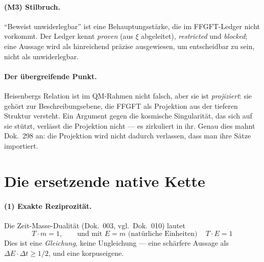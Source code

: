 \paragraph{(M3) Stilbruch.} \enquote{Beweist unwiderlegbar} ist eine Behauptungsstärke, die im
FFGFT-Ledger nicht vorkommt. Der Ledger kennt \emph{proven} (aus $\xi$ abgeleitet),
\emph{restricted} und \emph{blocked}; eine Aussage wird als hinreichend präzise ausgewiesen, um
entscheidbar zu sein, nicht als unwiderlegbar.

\paragraph{Der übergreifende Punkt.} Heisenbergs Relation ist im QM-Rahmen nicht falsch, aber sie
ist \emph{projiziert}: sie gehört zur Beschreibungsebene, die FFGFT als Projektion aus der
tieferen Struktur versteht. Ein Argument gegen die kosmische Singularität, das sich auf sie
stützt, verlässt die Projektion nicht --- es zirkuliert in ihr. Genau dies mahnt Dok.~298 an: die
Projektion wird nicht dadurch verlassen, dass man ihre Sätze importiert.

\section{Die ersetzende native Kette}

\paragraph{(1) Exakte Reziprozität.} Die Zeit-Masse-Dualität (Dok.~003, vgl.\ Dok.~010) lautet
\begin{equation}
T \cdot m = 1, \qquad\text{und mit } E = m \text{ (natürliche Einheiten)}\quad
\boxed{\,T \cdot E = 1\,}
\end{equation}
Dies ist eine \emph{Gleichung}, keine Ungleichung --- eine schärfere Aussage als
$\Delta E\cdot\Delta t \ge 1/2$, und eine korpuseigene.

